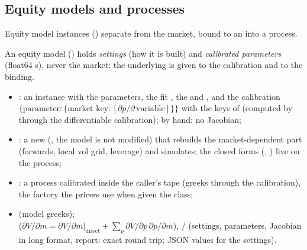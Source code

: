 \subsection{Equity models and processes}\label{sec:arch-equity-models}
Equity model instances () separate from the market, bound to an  into a process.

An equity model () holds \emph{settings} (how it is built) and \emph{calibrated parameters}
(float64 s), never the market: the underlying is given to the calibration and to the binding.
\begin{itemize}[nosep]
  \item {}: an instance with the parameters, the fit , the
         and , and the calibration 
        $\{\text{parameter}: \{\text{market key}: [\partial p / \partial\,\text{variable}]\}\}$ with the keys of
         (computed by  through the differentiable calibration);
         by hand: no Jacobian;
  \item {}: a new  (, the model is not modified)
        that rebuilds the market-dependent part (forwards, local vol grid, leverage) and simulates; the closed forms
        (, ) live on the process;
  \item {}: a process calibrated inside the caller's tape (greeks
        through the calibration), the factory the pricers use when given the class;
  \item {} (model greeks);\\
        ($\partial V/\partial m = \partial V/\partial m|_{\text{direct}} + \sum_p \partial V/\partial p\,\partial p/\partial m$),
         /  (settings, parameters, Jacobian in long format, report: exact round
        trip; JSON values for the settings).
\end{itemize}

